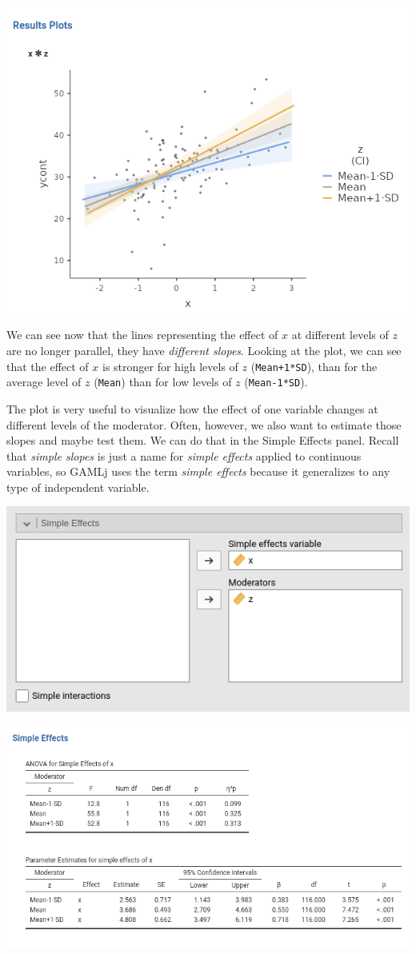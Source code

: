 \documentclass[
]{book}
\begin{document}
\includegraphics[width=0.9\linewidth]{bookletpics/2_output12}

We can see now that the lines representing the effect of \(x\) at different levels of \(z\) are no longer parallel, they have \emph{different slopes}. Looking at the plot, we can see that the effect of \(x\) is stronger for high levels of \(z\) (\texttt{Mean+1*SD}), than for the average level of \(z\) (\texttt{Mean}) than for low levels of \(z\) (\texttt{Mean-1*SD}).

The plot is very useful to visualize how the effect of one variable changes at different levels of the moderator. Often, however, we also want to estimate those slopes and maybe test them. We can do that in the {Simple Effects} panel. Recall that \emph{simple slopes} is just a name for \emph{simple effects} applied to continuous variables, so {GAMLj} uses the term \emph{simple effects} because it generalizes to any type of independent variable.

\includegraphics[width=0.7\linewidth]{bookletpics/2_input13}

\includegraphics[width=0.9\linewidth]{bookletpics/2_output13}
\end{document}
